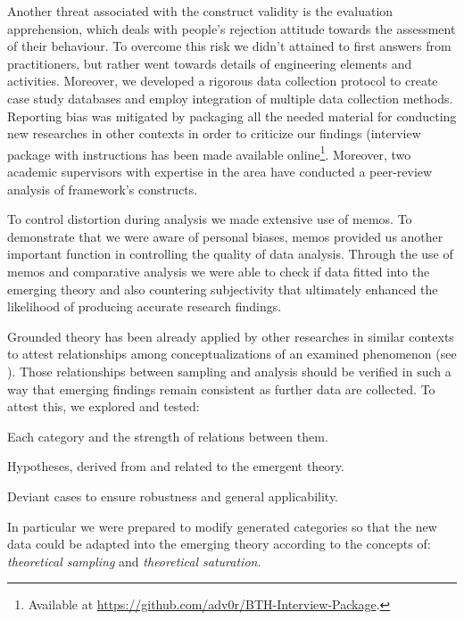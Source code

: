 \documentclass[10pt,journal,letterpaper,compsoc]{IEEEtran}
\begin{document}
Another threat associated with the construct validity is the evaluation apprehension, which deals with people's rejection attitude towards the assessment of their behaviour. To overcome this risk we didn't attained to first answers from practitioners, but rather went towards details of engineering elements and activities. Moreover, we developed a rigorous data collection protocol to create case study databases and employ integration of multiple data collection methods. Reporting bias was mitigated by packaging all the needed material for conducting new researches in other contexts in order to criticize our findings (interview package with instructions has been made available online\footnote{Available at \url{https://github.com/adv0r/BTH-Interview-Package}.}. Moreover, two academic supervisors with expertise in the area have conducted a peer-review analysis of framework's constructs.

To control distortion during analysis we made extensive use of memos. To demonstrate that we were aware of personal biases, memos provided us another important function in controlling the quality of data analysis. Through the use of memos and comparative analysis we were able to check if data fitted into the emerging theory and also countering subjectivity that ultimately enhanced the likelihood of producing accurate research findings.

Grounded theory has been already applied by other researches in similar contexts to attest relationships among conceptualizations of an examined phenomenon (see \cite{Coleman2007, Basri, Coleman2008a}). Those relationships between sampling and analysis should be verified in such a way that emerging findings remain consistent as further data are collected. To attest this, we  explored and tested:


\begin{compactitem}
\item Each category and the strength of relations between them.
\item Hypotheses, derived from and related to the emergent theory.
\item Deviant cases to ensure robustness and general applicability.
\end{compactitem}


In particular we were prepared to modify generated categories so that the new data could be adapted into the emerging theory according to the concepts of: \textit{theoretical sampling} and \textit{theoretical saturation}.
\end{document}
